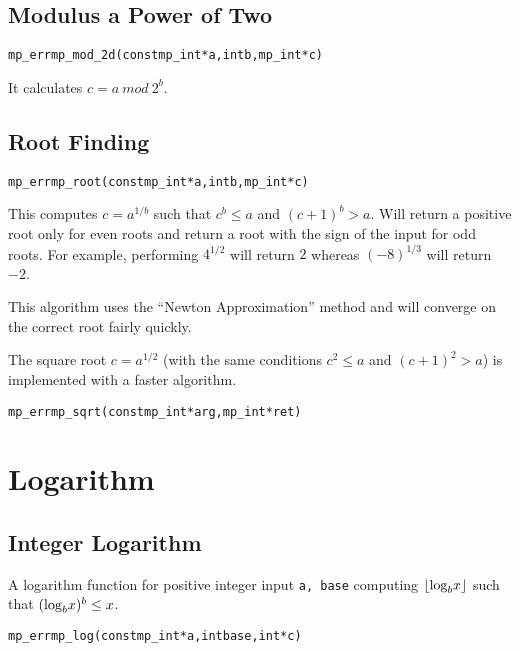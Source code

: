 \documentclass[synpaper]{book}
\def\log{{\rm log}}
\def\mod{{\mathit\ mod\ }}
\newcommand{\floor}[1]{\left\lfloor{#1}\right\rfloor}
\begin{document}
\section{Modulus a Power of Two}
\begin{alltt}
mp_err mp_mod_2d(const mp_int *a, int b, mp_int *c)
\end{alltt}
It calculates $c = a \mod 2^b$.

\section{Root Finding}
\begin{alltt}
mp_err mp_root(const mp_int *a, int b, mp_int *c)
\end{alltt}
This computes $c = a^{1/b}$ such that $c^b \le a$ and $(c+1)^b > a$. Will return a positive root
only for even roots and return a root with the sign of the input for odd roots.  For example,
performing $4^{1/2}$ will return $2$ whereas $(-8)^{1/3}$ will return $-2$.

This algorithm uses the ``Newton Approximation'' method and will converge on the correct root
fairly quickly.

The square root  $c = a^{1/2}$ (with the same conditions $c^2 \le a$ and $(c+1)^2 > a$) is
implemented with a faster algorithm.

\begin{alltt}
mp_err mp_sqrt(const mp_int *arg, mp_int *ret)
\end{alltt}

\chapter{Logarithm}
\section{Integer Logarithm}
A logarithm function for positive integer input \texttt{a, base} computing  $\floor{\log_bx}$ such
that $(\log_b x)^b \le x$.

\begin{alltt}
mp_err mp_log(const mp_int *a, int base, int *c)
\end{alltt}
\end{document}
